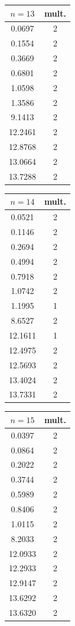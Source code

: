 \begin{table}
\medskip
\raisebox{12.5pt}
{\begin{minipage}{.2\textwidth}
\begin{tabular}{|c|c|}
\hline
$n = 13$ & mult.\\ \hline
0.0697&2 \\
0.1554&2 \\
0.3669&2 \\
0.6801&2 \\
1.0598&2 \\
1.3586&2 \\
9.1413&2 \\
12.2461&2 \\
12.8768&2 \\
13.0664&2 \\
13.7288&2 \\
\hline
\end{tabular}
\end{minipage}}
\begin{minipage}{.2\textwidth}
\begin{tabular}{|c|c|}
\hline
$n = 14$ & mult.\\ \hline
0.0521&2 \\
0.1146&2 \\
0.2694&2 \\
0.4994&2 \\
0.7918&2 \\
1.0742&2 \\
1.1995&1 \\
8.6527&2 \\
12.1611& 1 \\
12.4975&2 \\
12.5693&2 \\
13.4024&2 \\
13.7331&2 \\
\hline
\end{tabular}
\end{minipage}
\begin{minipage}{.2\textwidth}
\begin{tabular}{|c|c|}
\hline
$n = 15$ & mult.\\ \hline
0.0397&2 \\
0.0864&2 \\
0.2022&2 \\
0.3744&2 \\
0.5989&2 \\
0.8406&2 \\
1.0115&2 \\
8.2033&2 \\
12.0933&2 \\
12.2933&2 \\
12.9147&2 \\
13.6292&2 \\
13.6320&2 \\
\hline
\end{tabular}
\end{minipage}
\end{table}

